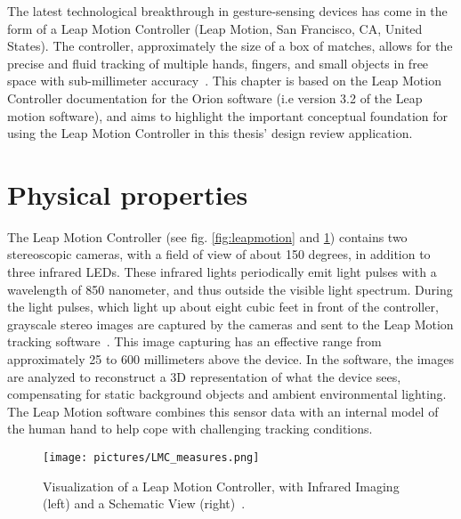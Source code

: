 
The latest technological breakthrough in gesture-sensing devices has come in the form of a Leap Motion Controller (Leap Motion, San Francisco, CA, United States). 
The controller, approximately the size of a box of matches, allows for the precise and fluid tracking of multiple hands, fingers, and small objects in free space with 
sub-millimeter accuracy~\citep{Guna2014}. This chapter is based on the Leap Motion Controller documentation for the Orion software (i.e version 3.2 of the Leap motion software), 
and aims to highlight the important conceptual foundation for using the Leap Motion Controller in this thesis' design review application.

\section{Physical properties}
The Leap Motion Controller (see fig. \ref{fig:leapmotion} and \ref{fig:leapmotion2}) contains two stereoscopic cameras, with a field of view of about 150 degrees, 
in addition to three infrared LEDs. These infrared lights periodically emit light pulses with a wavelength of 850 nanometer, and thus outside the visible light spectrum. 
During the light pulses, 
which light up about eight cubic feet in front of the controller, grayscale stereo images are captured by the cameras and sent to the 
Leap Motion tracking software~\citep{LeapMotion2016}. 
This image capturing has an effective range from approximately 25 to 600 millimeters above the device.
In the software, the images are analyzed to reconstruct a 3D representation of what the device sees, 
compensating for static background objects and ambient environmental lighting. 
The Leap Motion software combines this sensor data with an internal model of the human hand to help cope with challenging tracking conditions.


\begin{figure}%
	\texttt{[image: pictures/LMC\_measures.png]}
	\caption[Visualization of a Leap Motion Controller]{Visualization of a Leap Motion Controller, with Infrared Imaging (left) and a Schematic View (right)~\citep{Weichert2013}.}
	\label{fig:leapmotion2}
\end{figure} 

